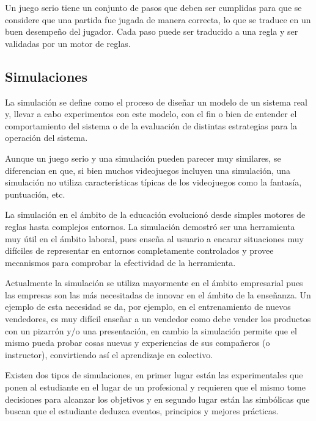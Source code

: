 

Un juego serio tiene un conjunto de pasos que deben ser cumplidas para 
que se considere que una partida fue jugada de manera correcta, lo que se traduce 
en un buen desempeño del jugador. Cada paso puede ser traducido a una regla
y ser validadas por un motor de reglas. 

\subsection{Simulaciones}

La simulación se define como el proceso de diseñar un modelo de un sistema real
y, llevar a cabo experimentos con este modelo, con el fin o bien de entender el
comportamiento del sistema o de la evaluación de distintas estrategias para la
operación del sistema\cite{ingalls2008introduction}. 

Aunque un juego serio y una simulación pueden parecer muy similares, se
diferencian en que, si bien muchos videojuegos incluyen una simulación, una
simulación no utiliza características típicas de los videojuegos como la
fantasía, puntuación, etc\cite{sg:aoverview}.

La simulación en el ámbito de la educación evolucionó desde simples motores de
reglas hasta complejos entornos. La simulación demostró ser una herramienta muy
útil en el ámbito laboral\cite{mariluz:seiousgames}, pues enseña al usuario a
encarar situaciones muy difíciles de representar en entornos completamente
controlados y provee mecanismos para comprobar la efectividad de la herramienta. 

Actualmente la simulación se utiliza mayormente en el ámbito empresarial pues las
empresas son las más necesitadas de innovar en el ámbito de la enseñanza. Un
ejemplo de esta necesidad se da, por ejemplo, en el entrenamiento de nuevos
vendedores, es muy difícil enseñar a un vendedor como debe vender los productos
con un pizarrón y/o una presentación, en cambio la simulación permite que el
mismo pueda probar cosas nuevas y experiencias de sus compañeros (o instructor),
convirtiendo así el aprendizaje en colectivo\cite{mariluz:seiousgames}.

Existen dos tipos de simulaciones, en primer lugar están las experimentales que
ponen al estudiante en el lugar de un profesional y requieren que el mismo tome
decisiones para alcanzar los objetivos y en segundo lugar están las simbólicas
que buscan que el estudiante deduzca eventos, principios y mejores
prácticas\cite{charsky:2010}. 

